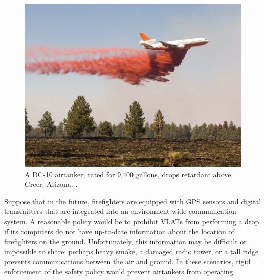 \documentclass[]             %
{NASA}                       %
\theoremstyle{definition}
\begin{document}
\begin{figure}[h]
  \label{fig:airtanker}
  \centering
  \includegraphics[scale=0.4]{images/dc10.jpg}
  \caption{A DC-10 airtanker, rated for 9,400 gallons, drops retardant above Greer, Arizona. \citationneeded.}
\end{figure}

Suppose that in the future, firefighters are equipped with GPS sensors
and digital transmitters that are integrated into an environment-wide
communication system. A reasonable policy would be to prohibit VLATs
from performing a drop if its computers do not have up-to-date
information about the location of firefighters on the
ground. Unfortunately, this information may be difficult or impossible
to share: perhaps heavy smoke, a damaged radio tower, or a tall ridge
prevents communications between the air and ground. In these
scenarios, rigid enforcement of the safety policy would prevent
airtankers from operating.
\end{document}
